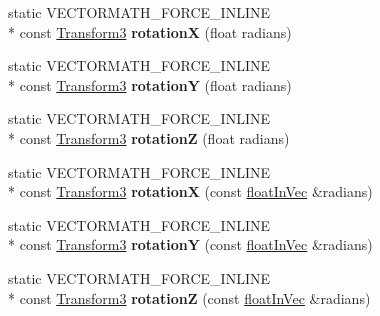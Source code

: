 \begin{DoxyCompactItemize}
\item 
\hypertarget{class_vectormath_1_1_aos_1_1_transform3_aac1a34d0b1093fe18a8df1ae1c3af04e}{static V\+E\+C\+T\+O\+R\+M\+A\+T\+H\+\_\+\+F\+O\+R\+C\+E\+\_\+\+I\+N\+L\+I\+N\+E \\*
const \hyperlink{class_vectormath_1_1_aos_1_1_transform3}{Transform3} {\bfseries rotation\+X} (float radians)}\label{class_vectormath_1_1_aos_1_1_transform3_aac1a34d0b1093fe18a8df1ae1c3af04e}

\item 
\hypertarget{class_vectormath_1_1_aos_1_1_transform3_a3c07b66c2ec540b4a813542988b625e9}{static V\+E\+C\+T\+O\+R\+M\+A\+T\+H\+\_\+\+F\+O\+R\+C\+E\+\_\+\+I\+N\+L\+I\+N\+E \\*
const \hyperlink{class_vectormath_1_1_aos_1_1_transform3}{Transform3} {\bfseries rotation\+Y} (float radians)}\label{class_vectormath_1_1_aos_1_1_transform3_a3c07b66c2ec540b4a813542988b625e9}

\item 
\hypertarget{class_vectormath_1_1_aos_1_1_transform3_a233abcc5abac075585415de5a868d399}{static V\+E\+C\+T\+O\+R\+M\+A\+T\+H\+\_\+\+F\+O\+R\+C\+E\+\_\+\+I\+N\+L\+I\+N\+E \\*
const \hyperlink{class_vectormath_1_1_aos_1_1_transform3}{Transform3} {\bfseries rotation\+Z} (float radians)}\label{class_vectormath_1_1_aos_1_1_transform3_a233abcc5abac075585415de5a868d399}

\item 
\hypertarget{class_vectormath_1_1_aos_1_1_transform3_ade0f353703a1de22afd0302668d9b4e6}{static V\+E\+C\+T\+O\+R\+M\+A\+T\+H\+\_\+\+F\+O\+R\+C\+E\+\_\+\+I\+N\+L\+I\+N\+E \\*
const \hyperlink{class_vectormath_1_1_aos_1_1_transform3}{Transform3} {\bfseries rotation\+X} (const \hyperlink{class_vectormath_1_1float_in_vec}{float\+In\+Vec} \&radians)}\label{class_vectormath_1_1_aos_1_1_transform3_ade0f353703a1de22afd0302668d9b4e6}

\item 
\hypertarget{class_vectormath_1_1_aos_1_1_transform3_ab54dbcbccfc22149eb94b4e76f0a361a}{static V\+E\+C\+T\+O\+R\+M\+A\+T\+H\+\_\+\+F\+O\+R\+C\+E\+\_\+\+I\+N\+L\+I\+N\+E \\*
const \hyperlink{class_vectormath_1_1_aos_1_1_transform3}{Transform3} {\bfseries rotation\+Y} (const \hyperlink{class_vectormath_1_1float_in_vec}{float\+In\+Vec} \&radians)}\label{class_vectormath_1_1_aos_1_1_transform3_ab54dbcbccfc22149eb94b4e76f0a361a}

\item 
\hypertarget{class_vectormath_1_1_aos_1_1_transform3_a6e92d7a62b99b507f50c36b6c55c92ca}{static V\+E\+C\+T\+O\+R\+M\+A\+T\+H\+\_\+\+F\+O\+R\+C\+E\+\_\+\+I\+N\+L\+I\+N\+E \\*
const \hyperlink{class_vectormath_1_1_aos_1_1_transform3}{Transform3} {\bfseries rotation\+Z} (const \hyperlink{class_vectormath_1_1float_in_vec}{float\+In\+Vec} \&radians)}\label{class_vectormath_1_1_aos_1_1_transform3_a6e92d7a62b99b507f50c36b6c55c92ca}


\end{DoxyCompactItemize}
